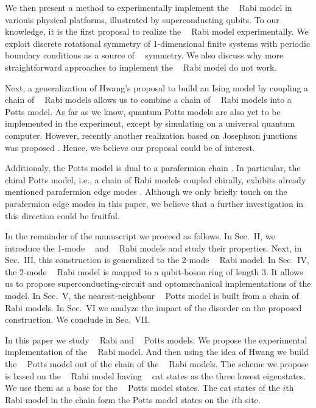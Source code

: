 \documentclass[reprint, aps, prx, amsmath, amssymb, longbibliography, superscriptaddress]{revtex4-2}
\DeclareMathOperator{\Zn}{\mathbb{Z}_n}
\DeclareMathOperator{\Zthree}{\mathbb{Z}_3}
\DeclareMathOperator{\Ztwo}{\mathbb{Z}_2}
\begin{document}
We then present a method to experimentally implement the $\Zthree$ Rabi model in variouis physical platforms, illustrated by superconducting qubits. To our knowledge, it is the first proposal to realize the $\Zthree$ Rabi model experimentally. We exploit discrete rotational symmetry of 1-dimensional finite systems with periodic boundary conditions as a source of $\Zn$ symmetry. We also discuss why more straightforward approaches to implement the $\Zn$ Rabi model do not work.

Next, a generalization of Hwang's proposal to build an Ising model by coupling a chain of $\Ztwo$ Rabi models \cite{hwang_largescale_2013} allows us to combine a chain of $\Zthree$ Rabi models into a $\Zthree$ Potts model. As far as we know, quantum Potts models are also yet to be implemented in the experiment, except by simulating on a universal quantum computer. However, recently another realization based on Josephson junctions was proposed \cite{wauters_engineering_2024}. Hence, we believe our proposal could be of interest. 

Additionaly, the Potts model is dual to a parafermion chain \cite{fradkin_disorder_1980}. In particular, the chiral Potts model, i.e., a chain of Rabi models coupled chirally, exhibits already mentioned parafermion edge modes \cite{fendley_free_2013,fendley_parafermionic_2012}. Although we only briefly touch on the parafermion edge modes in this paper, we believe that a further investigation in this direction could be fruitful.

In the remainder of the manuscript we proceed as follows. In Sec.~II, we introduce the 1-mode $\Zn$ and $\Zthree$ Rabi models and study their properties. Next, in Sec.~III, this construction is generalized to the 2-mode $\Zthree$ Rabi model. In Sec.~IV, the 2-mode $\Zthree$ Rabi model is mapped to a qubit-boson ring of length 3. It allows us to propose superconducting-circuit and optomechanical implementations of the model. In Sec.~V,  the nearest‑neighbour $\Zthree$ Potts model is built from a chain of $\Zthree$ Rabi models. In Sec.~VI we analyze the impact of the disorder on the proposed construction. We conclude in Sec.~VII.


In this paper we study $\Zthree$ Rabi and $\Zthree$ Potts models. We propose the experimental implementation of the $\Zthree$ Rabi model. And then using the idea of Hwang \cite{hwang_largescale_2013} we build the $\Zthree$ Potts model out of the chain of the $\Zthree$ Rabi models. The scheme we propose is based on the $\Zthree$ Rabi model having $\Zthree$ cat states as the three lowest eigenstates. We use them as a base for the $\Zthree$ Potts model states. The cat states of the $i$th Rabi model in the chain form the Potts model states on the $i$th site. 
\end{document}
